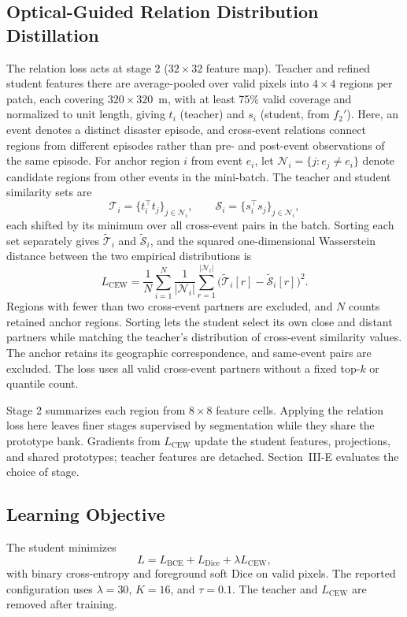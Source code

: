 \documentclass[journal]{IEEEtran}
\begin{document}
\subsection{Optical-Guided Relation Distribution Distillation}
The relation loss acts at stage 2 ($32\times32$ feature map). Teacher and refined student features there are average-pooled over valid pixels into $4\times4$ regions per patch, each covering $320\times320$~m, with at least 75\% valid coverage and normalized to unit length, giving $t_i$ (teacher) and $s_i$ (student, from $f_2'$). Here, an event denotes a distinct disaster episode, and cross-event relations connect regions from different episodes rather than pre- and post-event observations of the same episode. For anchor region $i$ from event $e_i$, let $\mathcal{N}_i=\{j: e_j\neq e_i\}$ denote candidate regions from other events in the mini-batch. The teacher and student similarity sets are
\begin{equation}
\mathcal{T}_i=\{t_i^\top t_j\}_{j\in\mathcal{N}_i},\qquad \mathcal{S}_i=\{s_i^\top s_j\}_{j\in\mathcal{N}_i},
\end{equation}
each shifted by its minimum over all cross-event pairs in the batch. Sorting each set separately gives $\tilde{\mathcal{T}}_i$ and $\tilde{\mathcal{S}}_i$, and the squared one-dimensional Wasserstein distance between the two empirical distributions is
\begin{equation}
L_{\mathrm{CEW}}=\frac{1}{N}\sum_{i=1}^{N}\frac{1}{|\mathcal{N}_i|}\sum_{r=1}^{|\mathcal{N}_i|}\bigl(\tilde{\mathcal{T}}_i[r]-\tilde{\mathcal{S}}_i[r]\bigr)^2 .
\label{eq:cew}
\end{equation}
Regions with fewer than two cross-event partners are excluded, and $N$ counts retained anchor regions. Sorting lets the student select its own close and distant partners while matching the teacher's distribution of cross-event similarity values. The anchor retains its geographic correspondence, and same-event pairs are excluded. The loss uses all valid cross-event partners without a fixed top-$k$ or quantile count.

Stage 2 summarizes each region from $8\times8$ feature cells. Applying the relation loss here leaves finer stages supervised by segmentation while they share the prototype bank. Gradients from $L_{\mathrm{CEW}}$ update the student features, projections, and shared prototypes; teacher features are detached. Section~III-E evaluates the choice of stage.

\subsection{Learning Objective}
The student minimizes
\begin{equation}
L=L_{\mathrm{BCE}}+L_{\mathrm{Dice}}+\lambda L_{\mathrm{CEW}},
\label{eq:loss}
\end{equation}
with binary cross-entropy and foreground soft Dice on valid pixels. The reported configuration uses $\lambda=30$, $K=16$, and $\tau=0.1$. The teacher and $L_{\mathrm{CEW}}$ are removed after training.
\end{document}
